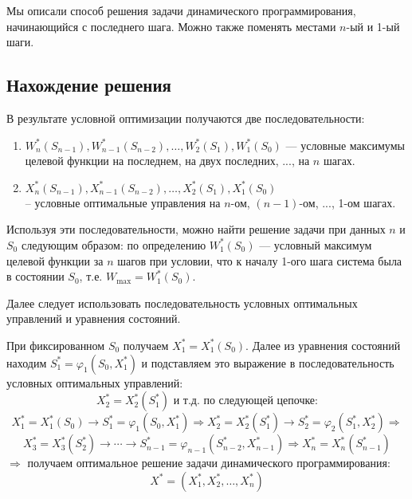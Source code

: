 \documentclass[17pt]{extarticle}
\begin{document}
Мы описали способ решения задачи динамического программирования, начинающийся с последнего шага.
Можно также поменять местами \( n \)-ый и 1-ый шаги.

\subsection{Нахождение решения}
В результате условной оптимизации получаются две последовательности:

\begin{enumerate}
    \item \( W_n^*(S_{n-1}), W_{n-1}^*(S_{n-2}), \ldots, W_2^*(S_1), W_1^*(S_0) \) — условные максимумы целевой функции на последнем,
          на двух последних, ..., на \( n \) шагах.

    \item \( X_n^*(S_{n-1}), X_{n-1}^*(S_{n-2}), \ldots, X_2^*(S_1), X_1^*(S_0) \) \\
          -- условные оптимальные управления на \( n \)-ом, \( (n-1) \)-ом, ..., 1-ом шагах.
\end{enumerate}

Используя эти последовательности, можно найти решение задачи при данных \( n \) и \( S_0 \) следующим образом:
по определению \( W_1^*(S_0) \) — условный максимум целевой функции за \( n \) шагов при условии, что к началу 1-ого шага система была в состоянии \( S_0 \), т.е. \( W_{\max} = W_1^*(S_0) \).

Далее следует использовать последовательность условных оптимальных управлений и уравнения состояний.

При фиксированном \( S_0 \) получаем \( X_1^* = X_1^*(S_0) \).
Далее из уравнения состояний находим \( S_1^* = \varphi_1(S_0, X_1^*) \) и подставляем это выражение
в последовательность условных оптимальных управлений:
\[
    X_2^* = X_2^*(S_1^*) \text{ и т.д. по следующей цепочке:}
\]
\[
    X_1^* = X_1^*(S_0) \rightarrow S_1^* = \varphi_1(S_0, X_1^*) \Rightarrow X_2^* = X_2^*(S_1^*) \rightarrow S_2^* = \varphi_2(S_1^*, X_2^*) \Rightarrow
\]
\[
    X_3^* = X_3^*(S_2^*) \rightarrow \cdots \rightarrow S_{n-1}^* = \varphi_{n-1}(S_{n-2}^*, X_{n-1}^*) \Rightarrow X_n^* = X_n^*(S_{n-1}^*)
\]
\(\Rightarrow\) получаем оптимальное решение задачи динамического программирования:
\[
    X^* = (X_1^*, X_2^*, \ldots, X_n^*)
\]
\end{document}

